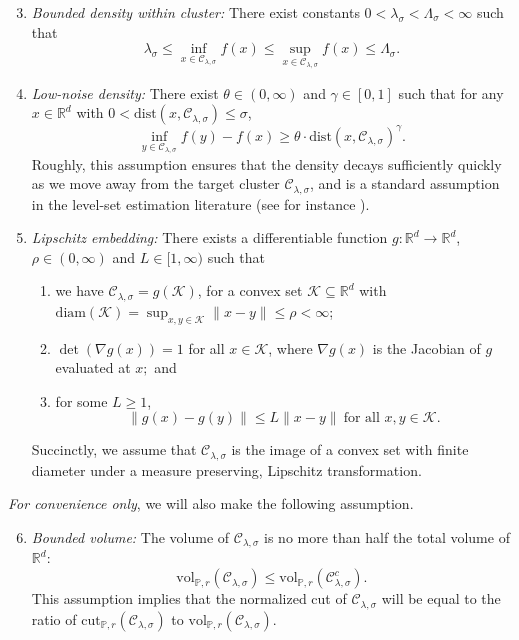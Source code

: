 \documentclass[11pt,twoside]{article}
\theoremstyle{definition}
\newcommand{\Reals}{\mathbb{R}}
\newcommand{\1}{\mathbf{1}}
\newcommand{\Rd}{\Reals^d}
\newcommand{\mc}[1]{\mathcal{#1}}
\newcommand{\Pbb}{\mathbb{P}}
\newcommand{\dist}{\mathrm{dist}}
\newcommand{\vol}{\mathrm{vol}}
\newcommand{\cut}{\mathrm{cut}}
\begin{document}
\begin{enumerate}[label=(A\arabic*)]
	\setcounter{enumi}{2}
	\item
	\label{asmp:lambda_bounded_density}
	\emph{Bounded density within cluster:} There exist constants
	$0<\lambda_{\sigma}< \Lambda_{\sigma}<\infty$ such that 
	$$
	\lambda_{\sigma} \leq \inf_{x \in \mc{C}_{\lambda,\sigma}} f(x) \leq \sup_{x \in \mc{C}_{\lambda,\sigma}} f(x)
	\leq \Lambda_{\sigma}.
	$$
	
	\item 
	\label{asmp:low_noise_density}
	\emph{Low-noise density:} There exist $\theta \in (0,\infty)$ and $\gamma \in
	[0,1]$ such that for any $x \in \Rd$ with $0 < \dist(x, \mc{C}_{\lambda,\sigma}) \leq \sigma$,     
	$$
	\inf_{y \in \mc{C}_{\lambda,\sigma}} f(y) - f(x) \geq  \theta \cdot \dist(x, \mc{C}_{\lambda,\sigma})^{\gamma}.  
	$$
	Roughly, this assumption ensures that the density decays sufficiently quickly
	as we move away from the target cluster $\mc{C}_{\lambda,\sigma}$, and is a standard assumption
	in the level-set estimation literature (see for instance \citet{singh2009}).
	
	\item
	\label{asmp:embedding}
	\emph{Lipschitz embedding:}
	There exists a differentiable function $g: \Reals^d \to \Reals^d$, $\rho \in (0,\infty)$ and $L \in [1,\infty)$ such that
	\begin{enumerate}
		\item we have $\mc{C}_{\lambda,\sigma} = g(\mathcal{K})$, for a convex set $\mathcal{K}
		\subseteq \Rd$ with $\mathrm{diam}(\mathcal{K}) = \sup_{x,y \in
			\mathcal{K}}\|x - y\| \leq \rho < \infty$;
		\item $\det(\nabla g (x)) = 1$ for all $x \in \mc{K}$, where $\nabla g(x)$ is
		the Jacobian of $g$ evaluated at $x;$ and 
		\item for some $L \geq 1$,   
		$$
		\|g(x) - g(y)\| \leq L \|x - y\| ~
		\text{for all $x,y \in \mathcal{K}$}. 
		$$
	\end{enumerate}
	Succinctly, we assume that $\mc{C}_{\lambda,\sigma}$ is the image of a convex set with finite
	diameter under a measure preserving, Lipschitz transformation. 
\end{enumerate}

\emph{For convenience only}, we will also make the following assumption.
\begin{enumerate}[label=(A\arabic*)]
	\setcounter{enumi}{5}
	\item
	\label{asmp:bounded_volume}
	\emph{Bounded volume:}
	The volume of $\mc{C}_{\lambda,\sigma}$ is no more than half the total volume of $\Rd$:
	$$
	\vol_{\Pbb,r}(\mc{C}_{\lambda,\sigma}) \leq \vol_{\Pbb,r}(\mc{C}_{\lambda,\sigma}^c). 
	$$
	This assumption implies that the normalized cut of $\mc{C}_{\lambda,\sigma}$ will be equal to the ratio of $\cut_{\Pbb,r}(\mc{C}_{\lambda,\sigma})$ to $\vol_{\Pbb,r}(\mc{C}_{\lambda,\sigma})$.
\end{enumerate}
\end{document}
